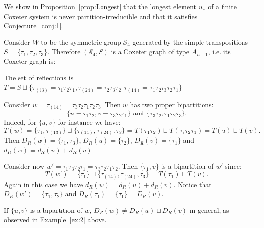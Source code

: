 \documentclass[ALCO,Unicode]{cedram}
\theoremstyle{definition}
\begin{document}
We show in Proposition~\ref{prop:Longest} that the longest element $w_\circ$ of a finite Coxeter system is never partition-irreducible and that it satisfies Conjecture~\ref{conj:1}. 


\begin{ex}\label{ex:2} Consider $W$ to be the symmetric group $\mathcal S_4$  generated by the simple transpositions $S=\{\tau_1,\tau_2,\tau_3\}$. Therefore $(\mathcal S_4,S)$ is a Coxeter graph of type $A_{n-1}$, i.e. its  Coxeter graph is:
\begin{center}
\end{center}
The set of reflections is $T=S\sqcup\{\tau_{(13)}=\tau_1\tau_2\tau_1,\tau_{(24)}=\tau_2\tau_3\tau_2,\tau_{(14)}=\tau_1\tau_2\tau_3\tau_2\tau_1\}$. 

Consider $w=\tau_{(14)}=\tau_3\tau_2\tau_1\tau_2\tau_3$. Then $w$ has two proper bipartitions:  
$$
\{u=\tau_1\tau_2,v=\tau_3\tau_2\tau_1\}\textrm{ and }\{\tau_3\tau_2,\tau_1\tau_2\tau_3\}.
$$ 
Indeed, for $\{u,v\}$ for instance we have:
$$
T(w)=\{\tau_1, \tau_{(13)}\}\sqcup\{\tau_{(14)},\tau_{(24)},\tau_{3}\}=T(\tau_1\tau_2)\sqcup T(\tau_3\tau_2\tau_1)=T(u)\sqcup T(v).
$$
Then $D_R(w)=\{\tau_1,\tau_3\}$, $D_R(u)=\{\tau_2\}$, $D_R(v)=\{\tau_1\}$ and $d_R(w)=d_R(u)+d_R(v)$.

Consider now $w'=\tau_1\tau_3\tau_2\tau_1=\tau_3\tau_2\tau_1\tau_2$. Then $\{\tau_1,v\}$ is a bipartition of $w'$ since:
$$
T(w')=\{\tau_1\}\sqcup\{\tau_{(14)},\tau_{(24)},\tau_{3}\}=T(\tau_1)\sqcup T(v).
$$
Again in this case we have $d_R(w)=d_R(u)+d_R(v)$. Notice that $D_R(w')=\{\tau_1,\tau_2\}$ and $D_R(\tau_1)=\{\tau_1\}=D_R(v)$.
\end{ex}

\begin{remark} If $\{u,v\}$ is a bipartition of $w$,  $D_R(w)\not = D_R(u)\sqcup D_R(v)$ in general, as observed in Example~\ref{ex:2} above. 
\end{remark}
\end{document}
